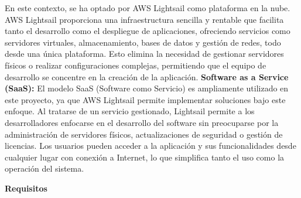 En este contexto, se ha optado por AWS Lightsail como plataforma en la nube. AWS Lightsail proporciona una infraestructura sencilla y rentable que facilita tanto el desarrollo como el despliegue de aplicaciones, ofreciendo servicios como servidores virtuales, almacenamiento, bases de datos y gestión de redes, todo desde una única plataforma. Esto elimina la necesidad de gestionar servidores físicos o realizar configuraciones complejas, permitiendo que el equipo de desarrollo se concentre en la creación de la aplicación. 
\newline
\textbf{Software as a Service (SaaS):}
El modelo SaaS (Software como Servicio) es ampliamente utilizado en este proyecto, ya que AWS Lightsail permite implementar soluciones bajo este enfoque. Al tratarse de un servicio gestionado, Lightsail permite a los desarrolladores enfocarse en el desarrollo del software sin preocuparse por la administración de servidores físicos, actualizaciones de seguridad o gestión de licencias. Los usuarios pueden acceder a la aplicación y sus funcionalidades desde cualquier lugar con conexión a Internet, lo que simplifica tanto el uso como la operación del sistema. 

\textbf{Requisitos}

